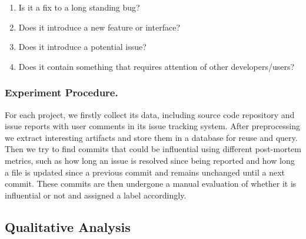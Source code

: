\begin{enumerate}
    \item Is it a fix to a long standing bug?
    \item Does it introduce a new feature or interface?
    \item Does it introduce a potential issue?
    \item Does it contain something that requires attention of other developers/users?
\end{enumerate}

\subsubsection{Experiment Procedure.}
\label{sec:procedure}
For each project, we firstly collect its data, including source code repository
and issue reports with user comments in its issue tracking system. After
preprocessing we extract interesting artifacts and store them in a database
for reuse and query.  Then we try to find commits that could be influential
using different post-mortem metrics, such as how long an issue is resolved
since being reported and how long a file is updated since a previous commit and
remains unchanged until a next commit.  These commits are then undergone a
manual evaluation of whether it is influential or not and assigned a label
accordingly.




\subsection{Qualitative Analysis}

